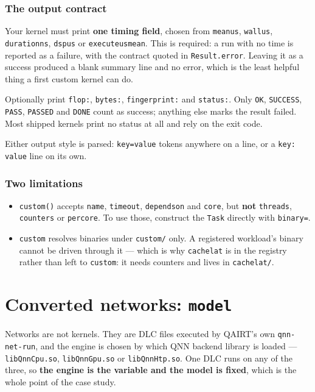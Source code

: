 \documentclass[11pt,a4paper]{article}
\newcommand{\code}[1]{\texttt{\let\_\breakableunderscore #1}}
\newcommand{\breakableunderscore}{\textunderscore\allowbreak}
\begin{document}
\subsubsection*{The output contract}

Your kernel must print \textbf{one timing field}, chosen from
\code{mean\_us}, \code{wall\_us}, \code{duration\_ns}, \code{dsp\_us} or
\code{execute\_us\_mean}. This is required: a run with no time is reported as a
failure, with the contract quoted in \code{Result.error}. Leaving it as a
success produced a blank summary line and no error, which is the least helpful
thing a first custom kernel can do.

Optionally print \code{flop:}, \code{bytes:}, \code{fingerprint:} and
\code{status:}. Only \code{OK}, \code{SUCCESS}, \code{PASS}, \code{PASSED} and
\code{DONE} count as success; anything else marks the result failed. Most
shipped kernels print no status at all and rely on the exit code.

Either output style is parsed: \code{key=value} tokens anywhere on a line, or a
\code{key: value} line on its own.

\subsubsection*{Two limitations}

\begin{itemize}[leftmargin=0.6cm]
  \item \code{custom()} accepts \code{name}, \code{timeout}, \code{depends\_on}
    and \code{core}, but \textbf{not} \code{threads}, \code{counters} or
    \code{per\_core}. To use those, construct the \code{Task} directly with
    \code{binary=}.
  \item \code{custom} resolves binaries under \code{custom/} only. A registered
    workload's binary cannot be driven through it --- which is why
    \code{cachelat} is in the registry rather than left to \code{custom}: it
    needs counters and lives in \code{cachelat/}.
\end{itemize}

\section{Converted networks: \texttt{model}}
\label{sec:models}

Networks are not kernels. They are DLC files executed by QAIRT's own
\code{qnn-net-run}, and the engine is chosen by which QNN backend library is
loaded --- \code{libQnnCpu.so}, \code{libQnnGpu.so} or \code{libQnnHtp.so}. One
DLC runs on any of the three, so \textbf{the engine is the variable and the
model is fixed}, which is the whole point of the case study.
\end{document}

